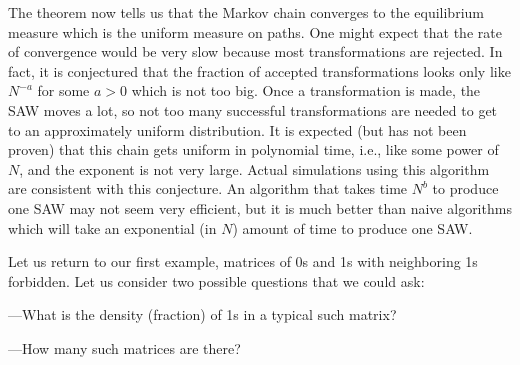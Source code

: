 \documentclass{stml-l}
\theoremstyle{definition}
\numberwithin{equation}{chapter}
\numberwithin{figure}{chapter}
\numberwithin{figure}{section}
\begin{document}
The theorem now tells us that the Markov chain converges to the
equilibrium measure which is the uniform measure on paths. One might
expect that the rate of convergence would be very slow because most
transformations are rejected. In fact, it is conjectured that the
fraction of accepted transformations looks only like $N^{-a}$ for
some $a>0$ which is not too big. Once a transformation is made, the
SAW moves a lot, so not too many successful transformations are
needed to get to an approximately uniform distribution. It is
expected (but has not been proven) that this chain gets uniform in
polynomial time, i.e., like some power of $N$, and the exponent is
not very large. Actual simulations using this algorithm are
consistent with this conjecture. An algorithm that takes time
$N^{b}$ to produce one SAW may not seem very efficient, but it is
much better than naive algorithms which will take an exponential (in
$N$) amount of time to produce one SAW.

Let us return to our first example, matrices of 0s and 1s with
neighboring 1s forbidden. Let us consider two possible questions
that we could ask:

---What is the density (fraction) of 1s in a typical such matrix?

---How many such matrices are there?
\end{document}
